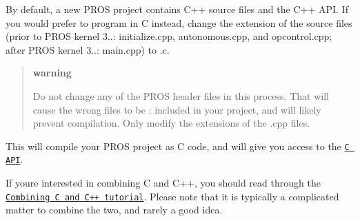 By default, a new P\+R\+OS project contains C++ source files and the C++ A\+PI. If you would prefer to program in C instead, change the extension of the source files (prior to P\+R\+OS kernel 3..\+: {\ttfamily initialize.\+cpp}, {\ttfamily autonomous.\+cpp}, and {\ttfamily opcontrol.\+cpp}; after P\+R\+OS kernel 3..\+: {\ttfamily main.\+cpp}) to {\ttfamily .c}.

\begin{quote}
{\bfseries warning}

Do not change any of the P\+R\+OS header files in this process. That will cause the wrong files to be \+: included in your project, and will likely prevent compilation. Only modify the extensions of the {\ttfamily .cpp} files.

\end{quote}
This will compile your P\+R\+OS project as C code, and will give you access to the \href{../../api/c/index.html}{\tt C A\+PI}.

If you\textquotesingle{}re interested in combining C and C++, you should read through the \href{../general/combining-c-cpp.html}{\tt Combining C and C++ tutorial}. Please note that it is typically a complicated matter to combine the two, and rarely a good idea. 
